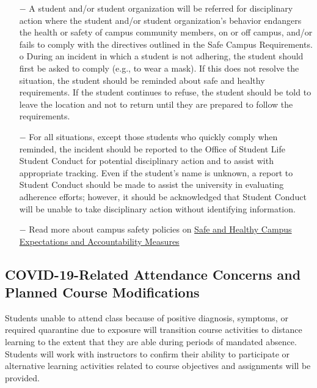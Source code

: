\documentclass[12pt,letter,english]{report}
\begin{document}
\begin{itemize}
      \item[$-$]
            A student and/or student organization will be referred for disciplinary action where the student and/or student organization's behavior endangers the health or safety of campus community members, on or off campus, and/or fails to comply with the directives outlined in the Safe Campus Requirements. o During an incident in which a student is not adhering, the student should first be asked to comply (e.g., to wear a mask). If this does not resolve the situation, the student should be reminded about safe and healthy requirements. If the student continues to refuse, the student should be told to leave the location and not to return until they are prepared to follow the requirements.
      \item[$-$]
            For all situations, except those students who quickly comply when reminded, the incident should be reported to the Office of Student Life Student Conduct for potential disciplinary action and to assist with appropriate tracking. Even if the student's name is unknown, a report to Student Conduct should be made to assist the university in evaluating adherence efforts; however, it should be acknowledged that Student Conduct will be unable to take disciplinary action without identifying information.
      \item[$-$] Read more about campus safety policies on \href{https://safeandhealthy.osu.edu/sites/default/files/2020/07/safe_and_healthy_campus_expectations_accountability_measures_7.24.2020_website.pdf?utm_campaign=oaa_faculty-staff-awareness_fy21_covid-academic-update-072720&utm_medium=email&utm_source=EOACLK}{Safe and Healthy Campus Expectations and Accountability Measures}
\end{itemize}

\subsection{COVID-19-Related Attendance Concerns and Planned Course Modifications}

Students unable to attend class because of positive diagnosis, symptoms, or required quarantine due to exposure will transition course activities to distance learning to the extent that they are able during periods of mandated absence. Students will work with instructors to confirm their ability to participate or alternative learning activities related to course objectives and assignments will be provided.
\end{document}
